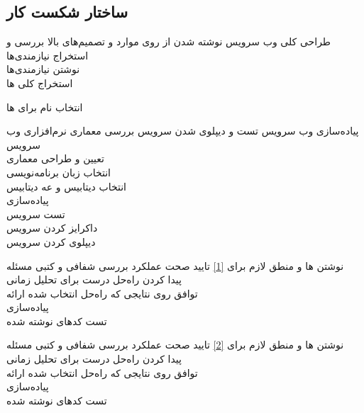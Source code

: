 \subsection{ساختار شکست کار}\label{ssec:process-api-wbs}
\begin{wbsbox}{}

\begin{wbssub}
{طراحی کلی وب سرویس}
{نوشته شدن  از روی موارد و تصمیم‌های بالا}
بررسی و استخراج نیازمندی‌ها \\
\task
نوشتن نیازمندی‌ها \\
\task
استخراج کلی
ها

\task
انتخاب نام برای ها
\end{wbssub}

\begin{wbssub}
{پیاده‌سازی وب ‌سرویس}
{تست و دیپلوی شدن سرویس}
\task
بررسی معماری نرم‌افزاری وب سرویس \\
\task
تعیین و طراحی معماری \\
\task
انتخاب زبان برنامه‌نویسی \\
\task
انتخاب دیتابیس و  عه دیتابیس \\
\task
پیاده‌سازی \\
\task
تست سرویس \\
\task
داکرایز کردن سرویس \\
\task
دیپلوی کردن سرویس
\end{wbssub}

\begin{wbssub}
{نوشتن ها و منطق لازم برای \ref{1}}
{تایید صحت عملکرد}
\task 
بررسی شفافی و کتبی مسئله \\
\task
پیدا کردن راه‌حل درست برای تحلیل زمانی \\
\task
توافق روی نتایجی که راه‌حل انتخاب شده ارائه \\
\task
پیاده‌سازی \\
\task
تست کد‌‌های نوشته شده
\end{wbssub}

\begin{wbssub}
{نوشتن ها و منطق لازم برای \ref{2}}
{تایید صحت عملکرد}
\task 
بررسی شفافی و کتبی مسئله \\
\task
پیدا کردن راه‌حل درست برای تحلیل زمانی \\
\task
توافق روی نتایجی که راه‌حل انتخاب شده ارائه \\
\task
پیاده‌سازی \\
\task
تست کد‌‌های نوشته شده
\end{wbssub}


\end{wbsbox}
